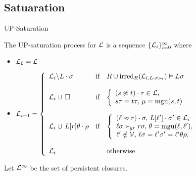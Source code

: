 \documentclass[%
handout,
]{beamer}
\begin{document}
\subsection{Satuaration}
\begin{frame}{UP-Saturation}
    
        The UP-{saturation process} for $\mathcal{L}$ is a sequence \( \{ \mathcal{L}_i \}_{i=0}^\infty \) where

        \begin{itemize}
            \item $\mathcal{L}_0 = \mathcal{L}$


        \item
        $\mathcal{L}_{i+1} = \left\{
                \begin{array}{lclc}
                    \mathcal{L}_i \backslash L\cdot\sigma
                    &\text{if}
                    &R \cup \operatorname{irred}_R(\mathcal{L}_{i,L\cdot\sigma\mathrel\succ_{\!\ell}}) \vDash L\sigma
                    \\
                    \\
                    \mathcal{L}_i \cup\,\square
                    &\text{if}
                    &\left\{\begin{array}{l}
                        (s\not\approx t)\cdot\tau\in\mathcal{L}_i
                        \\
                        s\tau = t\tau,\,
                        \mu=\operatorname{mgu}(s,t)
                    \end{array}\right.
                    \\
                    \\
                    \mathcal{L}_i \cup\, L[r]\theta\cdot\rho
                    &\text{if}
                    &\left\{\begin{array}{l}
                        (\ell\approx r)\cdot\sigma,\,
                        L[\ell']\cdot\sigma'\in\mathcal{L}_i
                        \\
                        \ell\sigma\mathrel\succ_{\!gr} r\sigma,\,
                        \theta=\operatorname{mgu}(\ell,\ell'),
                        \\
                        \ell'\notin\mathcal{V},\,
                        \ell\sigma = \ell'\sigma' = \ell'\theta\rho,
                    \end{array}\right.
                    \\
                    \\
                    \mathcal{L}_i
                    &&\text{otherwise}
                \end{array}
            \right.$
    \end{itemize}
    
\vspace{0.7em}
    
        Let \( \mathcal{L}^\infty \) be the set of persistent closures.


\end{frame}
\end{document}
